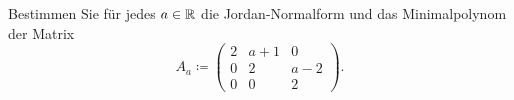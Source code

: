 \documentclass[a4paper, 10pt]{scrartcl}
\begin{document}
\begin{question}[subtitle = Jordan-Normalform in Abhängigkeit von einem Parameter]
  Bestimmen Sie für jedes $a \in \mathbb{R}$ die Jordan-Normalform und das Minimalpolynom der Matrix
  \[
              A_a
    \coloneqq \begin{pmatrix}
                2 & a+1 &  0  \\
                0 &  2  & a-2 \\
                0 &  0  &  2
              \end{pmatrix}.
  \]
\end{question}
\end{document}

